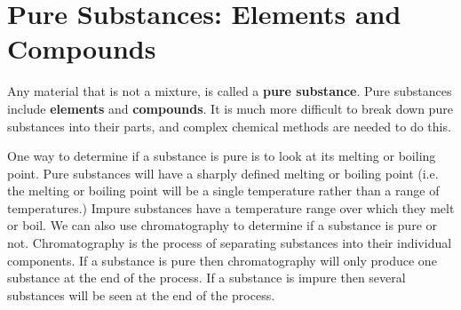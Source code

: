             \section{Pure Substances: Elements and Compounds}
            \nopagebreak
      \label{m38708*id63273}Any material that is not a mixture, is called a \textbf{pure substance}. Pure substances include \textbf{elements} and \textbf{compounds}. It is much more difficult to break down pure substances into their parts, and complex chemical methods are needed to do this.\par 
      \label{m38708*eip-862}One way to determine if a substance is pure is to look at its melting or boiling point. Pure substances will have a sharply defined melting or boiling point (i.e. the melting or boiling point will be a single temperature rather than a range of temperatures.) Impure substances have a temperature range over which they melt or boil. We can also use chromatography to determine if a substance is pure or not. Chromatography is the process of separating substances into their individual components. If a substance is pure then chromatography will only produce one substance at the end of the process. If a substance is impure then several substances will be seen at the end of the process. \par \label{m38708*eip-122}
